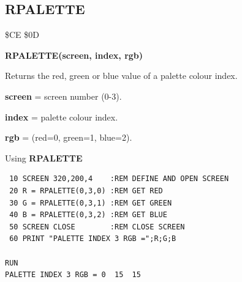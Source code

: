 \subsection{RPALETTE}
\begin{description}[leftmargin=2cm,style=nextline]
\item [Token:] \$CE \$0D
\item [Format:] {\bf RPALETTE(screen, index, rgb)}
\item [Usage:]  Returns the red, green or blue value of
                a palette colour index.

                {\bf screen} = screen number (0-3).

                {\bf index} = palette colour index.

                {\bf rgb} = (red=0, green=1, blue=2).

\item [Example:] Using {\bf RPALETTE}

\begin{tcolorbox}[colback=black,coltext=white]
\verbatimfont{\codefont}
\begin{verbatim}
 10 SCREEN 320,200,4    :REM DEFINE AND OPEN SCREEN
 20 R = RPALETTE(0,3,0) :REM GET RED
 30 G = RPALETTE(0,3,1) :REM GET GREEN
 40 B = RPALETTE(0,3,2) :REM GET BLUE
 50 SCREEN CLOSE        :REM CLOSE SCREEN
 60 PRINT "PALETTE INDEX 3 RGB =";R;G;B

RUN
PALETTE INDEX 3 RGB = 0  15  15
\end{verbatim}
\end{tcolorbox}
\end{description}


\newpage
